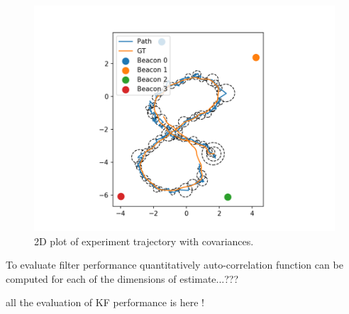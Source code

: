 \begin{figure}[H]
    \centering
    \includegraphics[width=\linewidth]{figures/2d_with_cov.png}
    \caption{2D plot of experiment trajectory with covariances.}
    \label{fig:exp_2d_path_covariances}
\end{figure}

To evaluate filter performance quantitatively auto-correlation function can be computed for each of the dimensions of estimate...???


\cite{Reid2010EstimationI} all the evaluation of KF performance is here !